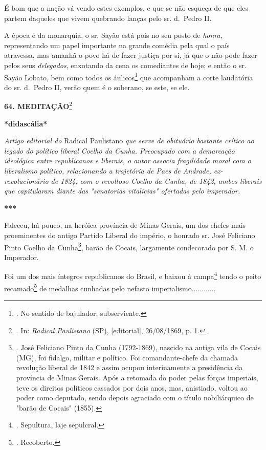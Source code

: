 É bom que a nação vá vendo estes exemplos, e que se não esqueça de que
eles partem daqueles que vivem quebrando lanças pelo sr. d.~Pedro II.

A época é da monarquia, o sr. Sayão está pois no seu posto de
\emph{honra}, representando um papel importante na grande comédia pela
qual o país atravessa, mas amanhã o povo há de fazer justiça por si, já
que o não pode fazer pelos seus \emph{delegados}, enxotando da cena os
comediantes de hoje; e então o sr. Sayão Lobato, bem como todos os
áulicos\footnote{. No sentido de bajulador, subserviente.} que
acompanham a corte laudatória do sr. d.~Pedro II, verão quem é o
soberano, se este, se ele.

\textbf{64. MEDITAÇÃO}\footnote{. In: \emph{Radical Paulistano} (SP),
  {[}editorial{]}, 26/08/1869, p. 1.}

\textbf{*didascália*}

\emph{Artigo editorial do} Radical Paulistano \emph{que serve de
obituário bastante crítico ao legado do político liberal Coelho da
Cunha. Preocupado com a demarcação ideológica entre republicanos e
liberais, o autor associa fragilidade moral com o liberalismo político,
relacionando a trajetória de Paes de Andrade, ex-revolucionário de 1824,
com o revoltoso Coelho da Cunha, de 1842, ambos liberais que capitularam
diante das "senatorias vitalícias" ofertadas pelo imperador.}

\textbf{***}

Faleceu, há pouco, na heróica província de Minas Gerais, um dos chefes
mais proeminentes do antigo Partido Liberal do império, o honrado sr.
José Feliciano Pinto Coelho da Cunha\footnote{. José Feliciano Pinto da
  Cunha (1792-1869), nascido na antiga vila de Cocais (MG), foi fidalgo,
  militar e político. Foi comandante-chefe da chamada revolução liberal
  de 1842 e assim ocupou interinamente a presidência da província de
  Minas Gerais. Após a retomada do poder pelas forças imperiais, teve os
  direitos políticos cassados por dois anos, mas, anistiado, voltou ao
  poder como deputado, sendo depois agraciado com o título nobiliárquico
  de "barão de Cocais" (1855).}, barão de Cocais, largamente condecorado
por S. M. o Imperador.

Foi um dos mais íntegros republicanos do Brasil, e baixou à
campa\footnote{. Sepultura, laje sepulcral.} tendo o peito
recamado\footnote{. Recoberto.} de medalhas cunhadas pelo nefasto
imperialismo............

